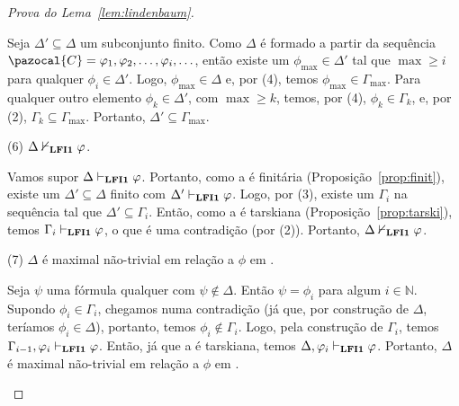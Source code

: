 \begin{proof}[Prova do Lema~\ref{lem:lindenbaum}]
\begin{adjustwidth}{1cm}{}
            \begin{adjustwidth}{1cm}{}

                Seja $\Delta' \subseteq \Delta$ um subconjunto finito. Como $\Delta$ é formado a partir da sequência $\pazocal{C} = \phi_1, \phi_2, \ldots, \phi_i, \ldots$, então existe um $\phi_{\max} \in \Delta'$ tal que $\max \geq i$ para qualquer $\phi_i \in \Delta'$. Logo, $\phi_{\max} \in \Delta$ e, por (4), temos $\phi_{\max} \in \Gamma_{\max}$. Para qualquer outro elemento $\phi_k \in \Delta'$, com $\max \geq k$, temos, por (4), $\phi_k \in \Gamma_k$, e, por (2), $\Gamma_k \subseteq \Gamma_{\max}$. Portanto, $\Delta' \subseteq \Gamma_{\max}$.

            \end{adjustwidth}


            \noindent(6) $\Delta \nvdash_{{\normalfont\textbf{LFI1}}{}} \varphi$.

            \begin{adjustwidth}{1cm}{}
                Vamos supor $\Delta \vdash_{{\normalfont\textbf{LFI1}}{}} \varphi$. Portanto, como a \lfium{} é finitária (Proposição~\ref{prop:finit}), existe um $\Delta' \subseteq \Delta$ finito com $\Delta' \vdash_{{\normalfont\textbf{LFI1}}{}} \varphi$. Logo, por (3), existe um $\Gamma_i$ na sequência tal que $\Delta' \subseteq \Gamma_i$. Então, como a \lfium{} é tarskiana (Proposição~\ref{prop:tarski}), temos $\Gamma_i \vdash_{{\normalfont\textbf{LFI1}}{}} \varphi$, o que é uma contradição (por (2)). Portanto, $\Delta \nvdash_{{\normalfont\textbf{LFI1}}{}} \varphi$.
            \end{adjustwidth}

            \noindent(7) $\Delta$ é maximal não-trivial em relação a $\phi$ em \lfium{}.
            
            \begin{adjustwidth}{1cm}{}
                Seja $\psi$ uma fórmula qualquer com $\psi \not \in \Delta$. Então $\psi = \phi_i$ para algum $i \in \mathbb{N}$. Supondo $\phi_i \in \Gamma_i$, chegamos numa contradição (já que, por construção de $\Delta$, teríamos $\phi_i \in \Delta$), portanto, temos $\phi_i \not \in \Gamma_i$. Logo, pela construção de $\Gamma_i$, temos $\Gamma_{i - 1}, \varphi_i \vdash_{{\normalfont\textbf{LFI1}}{}} \varphi$. Então, já que a \lfium{} é tarskiana, temos $\Delta, \varphi_i \vdash_{{\normalfont\textbf{LFI1}}{}} \varphi$. Portanto, $\Delta$ é maximal não-trivial em relação a $\phi$ em \lfium{}.

            \end{adjustwidth}


        \end{adjustwidth}
            
            
        \end{proof}
        

